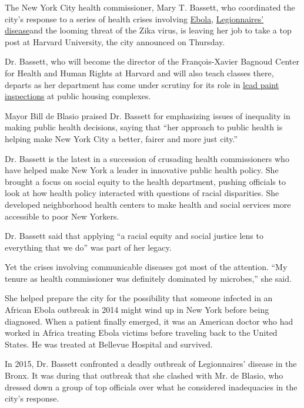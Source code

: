 The New York City health commissioner, Mary T. Bassett, who coordinated
the city's response to a series of health crises involving
\href{https://www.nytimes3xbfgragh.onion/2014/10/26/nyregion/in-new-york-bringing-a-comforting-message-during-a-chaotic-time.html}{Ebola},
\href{https://www.nytimes3xbfgragh.onion/2015/08/07/nyregion/new-york-ordering-tests-of-water-cooling-towers-amid-legionnaires-outbreak.html}{Legionnaires'
disease}and the looming threat of the Zika virus, is leaving her job to
take a top post at Harvard University, the city announced on Thursday.

Dr. Bassett, who will become the director of the François-Xavier Bagnoud
Center for Health and Human Rights at Harvard and will also teach
classes there, departs as her department has come under scrutiny for its
role in
\href{https://www.nytimes3xbfgragh.onion/2018/07/27/nyregion/inquiry-on-public-housing-lead-failures-extends-to-health-department.html}{lead
paint inspections} at public housing complexes.

Mayor Bill de Blasio praised Dr. Bassett for emphasizing issues of
inequality in making public health decisions, saying that ``her approach
to public health is helping make New York City a better, fairer and more
just city.''

Dr. Bassett is the latest in a succession of crusading health
commissioners who have helped make New York a leader in innovative
public health policy. She brought a focus on social equity to the health
department, pushing officials to look at how health policy interacted
with questions of racial disparities. She developed neighborhood health
centers to make health and social services more accessible to poor New
Yorkers.

Dr. Bassett said that applying ``a racial equity and social justice lens
to everything that we do'' was part of her legacy.

Yet the crises involving communicable diseases got most of the
attention. ``My tenure as health commissioner was definitely dominated
by microbes,'' she said.

She helped prepare the city for the possibility that someone infected in
an African Ebola outbreak in 2014 might wind up in New York before being
diagnosed. When a patient finally emerged, it was an American doctor who
had worked in Africa treating Ebola victims before traveling back to the
United States. He was treated at Bellevue Hospital and survived.

In 2015, Dr. Bassett confronted a deadly outbreak of Legionnaires'
disease in the Bronx. It was during that outbreak that she clashed with
Mr. de Blasio, who dressed down a group of top officials over what he
considered inadequacies in the city's response.

